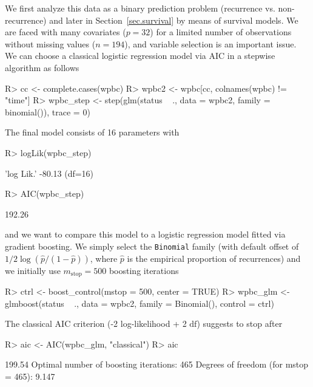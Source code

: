 \documentclass{article}
\newcommand{\Robject}[1]{\texttt{#1}}
\newcommand{\df}{\mbox{df}}
\newenvironment{Schunk}{}{}
\begin{document}
We first analyze this data as a binary prediction problem 
(recurrence vs. non-recurrence) and later in Section~\ref{sec.survival} 
by means of survival models. We are faced with many covariates ($p = 32$) 
for a limited number of observations without missing values 
($n = 194$), and variable selection is an important issue. We can
choose a classical logistic regression model  
via AIC in a stepwise algorithm as follows 
\begin{Schunk}
\begin{Sinput}
R> cc <- complete.cases(wpbc)
R> wpbc2 <- wpbc[cc, colnames(wpbc) != "time"]
R> wpbc_step <- step(glm(status ~ ., data = wpbc2, 
         family = binomial()), trace = 0)
\end{Sinput}
\end{Schunk}
The final model consists of 16 parameters with
\begin{Schunk}
\begin{Sinput}
R> logLik(wpbc_step)
\end{Sinput}
\begin{Soutput}
'log Lik.' -80.13 (df=16)
\end{Soutput}
\begin{Sinput}
R> AIC(wpbc_step)
\end{Sinput}
\begin{Soutput}
[1] 192.26
\end{Soutput}
\end{Schunk}
and we want to compare this model to a logistic regression model fitted via gradient boosting. 
We simply select the \Robject{Binomial} family (with default offset of $1/2
\log(\hat{p} / (1 - \hat{p}))$,  
where $\hat{p}$ is the empirical proportion of recurrences) and we
initially use
$m_\text{stop} = 500$ boosting iterations 
\begin{Schunk}
\begin{Sinput}
R> ctrl <- boost_control(mstop = 500, center = TRUE)
R> wpbc_glm <- glmboost(status ~ ., data = wpbc2, 
         family = Binomial(), control = ctrl)
\end{Sinput}
\end{Schunk}
The classical AIC criterion (-2 log-likelihood + 2 $\df$) suggests to stop after
\begin{Schunk}
\begin{Sinput}
R> aic <- AIC(wpbc_glm, "classical")
R> aic
\end{Sinput}
\begin{Soutput}
[1] 199.54
Optimal number of boosting iterations: 465 
Degrees of freedom (for mstop = 465): 9.147 
\end{Soutput}
\end{Schunk}
\end{document}
